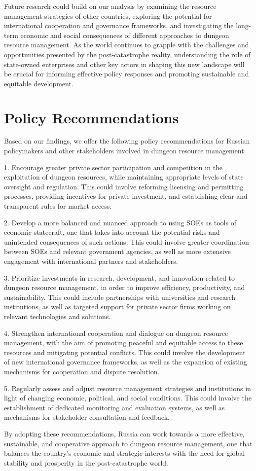 \documentclass[12pt, a4paper]{article}
\begin{document}
Future research could build on our analysis by examining the resource management strategies of other countries, exploring the potential for international cooperation and governance frameworks, and investigating the long-term economic and social consequences of different approaches to dungeon resource management. As the world continues to grapple with the challenges and opportunities presented by the post-catastrophe reality, understanding the role of state-owned enterprises and other key actors in shaping this new landscape will be crucial for informing effective policy responses and promoting sustainable and equitable development.

\section{Policy Recommendations}
Based on our findings, we offer the following policy recommendations for Russian policymakers and other stakeholders involved in dungeon resource management:

1. Encourage greater private sector participation and competition in the exploitation of dungeon resources, while maintaining appropriate levels of state oversight and regulation. This could involve reforming licensing and permitting processes, providing incentives for private investment, and establishing clear and transparent rules for market access.

2. Develop a more balanced and nuanced approach to using SOEs as tools of economic statecraft, one that takes into account the potential risks and unintended consequences of such actions. This could involve greater coordination between SOEs and relevant government agencies, as well as more extensive engagement with international partners and stakeholders.

3. Prioritize investments in research, development, and innovation related to dungeon resource management, in order to improve efficiency, productivity, and sustainability. This could include partnerships with universities and research institutions, as well as targeted support for private sector firms working on relevant technologies and solutions.

4. Strengthen international cooperation and dialogue on dungeon resource management, with the aim of promoting peaceful and equitable access to these resources and mitigating potential conflicts. This could involve the development of new international governance frameworks, as well as the expansion of existing mechanisms for cooperation and dispute resolution.

5. Regularly assess and adjust resource management strategies and institutions in light of changing economic, political, and social conditions. This could involve the establishment of dedicated monitoring and evaluation systems, as well as mechanisms for stakeholder consultation and feedback.

By adopting these recommendations, Russia can work towards a more effective, sustainable, and cooperative approach to dungeon resource management, one that balances the country's economic and strategic interests with the need for global stability and prosperity in the post-catastrophe world.



\end{document}
